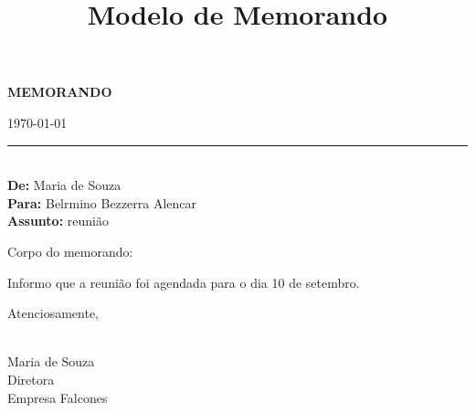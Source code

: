 \documentclass[a4paper,12pt]{article}
\title{Modelo de Memorando}
\author{}
\date{}
\begin{document}
\begin{center}
    \textbf{MEMORANDO}
\end{center}

\bigskip

\begin{flushright}
    \today \\
    \rule{5cm}{0.4pt} \\
    \textbf{De:} Maria de Souza \\
    \textbf{Para:} Belrmino Bezzerra Alencar \\
    \textbf{Assunto:} reunião
\end{flushright}

\bigskip

Corpo do memorando:

\bigskip

Informo que a reunião foi agendada para o dia 10 de setembro.

\bigskip

Atenciosamente,

\bigskip

\hrulefill \\
Maria de Souza \\
Diretora \\
Empresa Falcones
\end{document}
